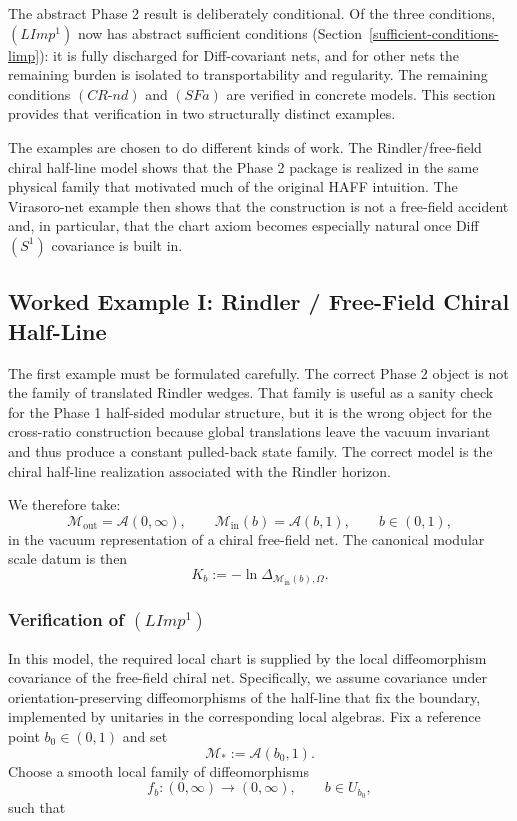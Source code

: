 \documentclass[12pt]{article}
\theoremstyle{definition}
\theoremstyle{remark}
\begin{document}
The abstract Phase 2 result is deliberately conditional. Of the three
conditions, $(LImp^1)$ now has abstract sufficient conditions
(Section~\ref{sufficient-conditions-limp}): it is fully discharged for
Diff-covariant nets, and for other nets the remaining burden is isolated
to transportability and regularity. The remaining conditions $(CR\text{-}nd)$ and $(SFa)$
are verified in concrete models. This section provides that
verification in two structurally distinct examples.

The examples are chosen to do different kinds of work. The
Rindler/free-field chiral half-line model shows that the Phase 2 package
is realized in the same physical family that motivated much of the
original HAFF intuition. The Virasoro-net example then shows that the
construction is not a free-field accident and, in particular, that the
chart axiom becomes especially natural once Diff\((S^1)\) covariance is
built in.

\subsection{Worked Example I: Rindler / Free-Field Chiral
Half-Line}\label{worked-example-i-rindler-free-field-chiral-half-line}

The first example must be formulated carefully. The correct Phase 2
object is not the family of translated Rindler wedges. That family is
useful as a sanity check for the Phase 1 half-sided modular structure,
but it is the wrong object for the cross-ratio construction because
global translations leave the vacuum invariant and thus produce a
constant pulled-back state family. The correct model is the chiral
half-line realization associated with the Rindler horizon.

We therefore take: \[
\mathcal{M}_{\mathrm{out}}=\mathcal{A}(0,\infty),
\qquad
\mathcal{M}_{\mathrm{in}}(b)=\mathcal{A}(b,1),
\qquad
b\in(0,1),
\] in the vacuum representation of a chiral free-field net. The
canonical modular scale datum is then \[
K_b:=-\ln\Delta_{\mathcal{M}_{\mathrm{in}}(b),\Omega}.
\]

\subsubsection{\texorpdfstring{Verification of
\((LImp^1)\)}{Verification of (LImp\^{}1)}}\label{verification-of-limp1}

In this model, the required local chart is supplied by the local
diffeomorphism covariance of the free-field chiral net. Specifically, we
assume covariance under orientation-preserving diffeomorphisms of the
half-line that fix the boundary, implemented by unitaries in the
corresponding local algebras. Fix a reference point
\(b_0\in(0,1)\) and set \[
\mathcal{M}_*:=\mathcal{A}(b_0,1).
\] Choose a smooth local family of diffeomorphisms \[
f_b:(0,\infty)\to(0,\infty),
\qquad
b\in U_{b_0},
\] such that
\end{document}
